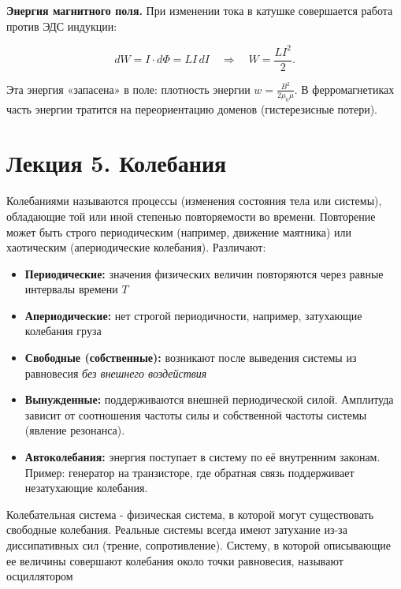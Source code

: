 \documentclass[12pt]{article}
\begin{document}
\noindent\textbf{Энергия магнитного поля.} При изменении тока в катушке совершается работа против ЭДС индукции:

\[
    dW = I \cdot d\Phi = L I \, dI \quad \Rightarrow \quad W = \frac{LI^2}{2}.
\]

Эта энергия «запасена» в поле: плотность энергии $w = \frac{B^2}{2\mu_0\mu}$. 
В ферромагнетиках часть энергии тратится на переориентацию доменов (гистерезисные потери).







\section{Лекция 5. Колебания}

Колебаниями называются процессы (изменения состояния тела или системы), 
обладающие той или иной степенью повторяемости во времени. 
Повторение может быть строго периодическим (например, движение маятника) 
или хаотическим (апериодические колебания). Различают:

\begin{itemize}
    \item \textbf{Периодические:} значения физических величин повторяются через равные интервалы времени $T$
    
    \item \textbf{Апериодические:} нет строгой периодичности, например, затухающие колебания груза

    \item \textbf{Свободные (собственные):} возникают после выведения системы из равновесия \textit{без внешнего воздействия}
    
    \item \textbf{Вынужденные:} поддерживаются внешней периодической силой. Амплитуда зависит от соотношения частоты силы и собственной частоты системы (явление резонанса).
    
    \item \textbf{Автоколебания:} энергия поступает в систему по её внутренним законам. Пример: генератор на транзисторе, где обратная связь поддерживает незатухающие колебания.
\end{itemize}

Колебательная система - физическая система, в которой могут существовать свободные колебания. 
Реальные системы всегда имеют затухание из-за диссипативных сил (трение, сопротивление).
Систему, в которой описывающие ее величины совершают колебания около точки равновесия, называют осциллятором
\end{document}
